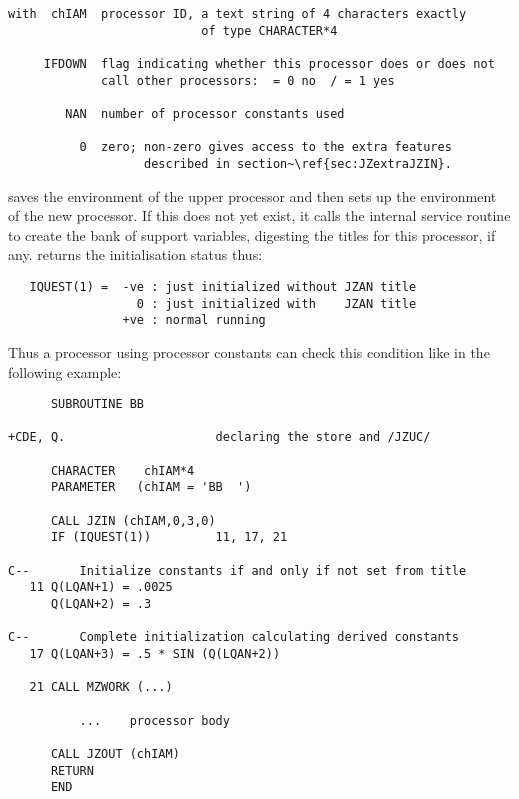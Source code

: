 
\begin{verbatim}
with  chIAM  processor ID, a text string of 4 characters exactly
                           of type CHARACTER*4

     IFDOWN  flag indicating whether this processor does or does not
             call other processors:  = 0 no  / = 1 yes

        NAN  number of processor constants used

          0  zero; non-zero gives access to the extra features
                   described in section~\ref{sec:JZextraJZIN}.
\end{verbatim} 

 saves the environment of the upper processor
and then sets up the environment of the
new processor.
If this does not yet exist,
it calls the internal service routine 
 to create the bank of support variables,
digesting the titles for this processor, if any.
 returns the initialisation status thus:

\begin{verbatim}
   IQUEST(1) =  -ve : just initialized without JZAN title
                  0 : just initialized with    JZAN title
                +ve : normal running
\end{verbatim} 

Thus a processor using processor constants can check
this condition like in the following example:

\begin{verbatim}
      SUBROUTINE BB

+CDE, Q.                     declaring the store and /JZUC/

      CHARACTER    chIAM*4
      PARAMETER   (chIAM = 'BB  ')

      CALL JZIN (chIAM,0,3,0)
      IF (IQUEST(1))         11, 17, 21

C--       Initialize constants if and only if not set from title
   11 Q(LQAN+1) = .0025
      Q(LQAN+2) = .3

C--       Complete initialization calculating derived constants
   17 Q(LQAN+3) = .5 * SIN (Q(LQAN+2))

   21 CALL MZWORK (...)

          ...    processor body

      CALL JZOUT (chIAM)
      RETURN
      END
\end{verbatim} 

